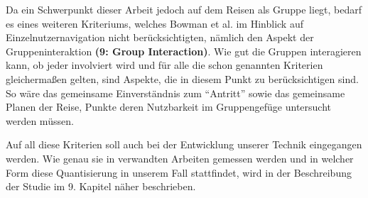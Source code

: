 Da ein Schwerpunkt dieser Arbeit jedoch auf dem Reisen als Gruppe liegt, bedarf es eines weiteren Kriteriums, welches Bowman et al. im Hinblick auf Einzelnutzernavigation nicht berücksichtigten, nämlich den Aspekt der Gruppeninteraktion \textbf{(9: Group Interaction)}. Wie gut die Gruppen interagieren kann, ob jeder involviert wird und für alle die schon genannten Kriterien gleichermaßen gelten, sind Aspekte, die in diesem Punkt zu berücksichtigen sind.
So wäre das gemeinsame Einverständnis zum “Antritt” sowie das gemeinsame Planen der Reise, Punkte deren Nutzbarkeit im Gruppengefüge untersucht werden müssen.

Auf all diese Kriterien soll auch bei der Entwicklung unserer Technik eingegangen werden. Wie genau sie in verwandten Arbeiten gemessen werden und in welcher Form diese Quantisierung in unserem Fall stattfindet, wird in der Beschreibung der Studie im 9. Kapitel näher beschrieben.